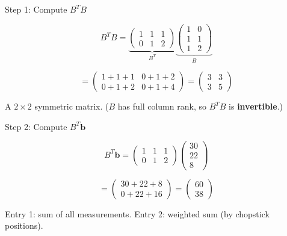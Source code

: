 \documentclass[10pt]{beamer}
\theoremstyle{definition}
\newcommand{\x}[1]{\alert{\textbf{#1}}}
\begin{document}
\begin{frame}{Step 1: Compute $B^TB$}

$$B^TB = \underbrace{\begin{pmatrix} 1 & 1 & 1 \\ 0 & 1 & 2 \end{pmatrix}}_{B^T}\underbrace{\begin{pmatrix} 1 & 0 \\ 1 & 1 \\ 1 & 2 \end{pmatrix}}_{B}$$

\vspace{0.5em}

$$= \begin{pmatrix} 1+1+1 & 0+1+2 \\ 0+1+2 & 0+1+4 \end{pmatrix} = \begin{pmatrix} 3 & 3 \\ 3 & 5 \end{pmatrix}$$

\vspace{0.5em}

A $2 \times 2$ symmetric matrix. \; ($B$ has full column rank, so $B^TB$ is \x{invertible}.)

\end{frame}


\begin{frame}{Step 2: Compute $B^T\mathbf{b}$}

$$B^T\mathbf{b} = \begin{pmatrix} 1 & 1 & 1 \\ 0 & 1 & 2 \end{pmatrix}\begin{pmatrix} 30 \\ 22 \\ 8 \end{pmatrix}$$

\vspace{0.5em}

$$= \begin{pmatrix} 30 + 22 + 8 \\ 0 + 22 + 16 \end{pmatrix} = \begin{pmatrix} 60 \\ 38 \end{pmatrix}$$

\vspace{0.5em}

Entry 1: sum of all measurements. \quad Entry 2: weighted sum (by chopstick positions).

\end{frame}
\end{document}
